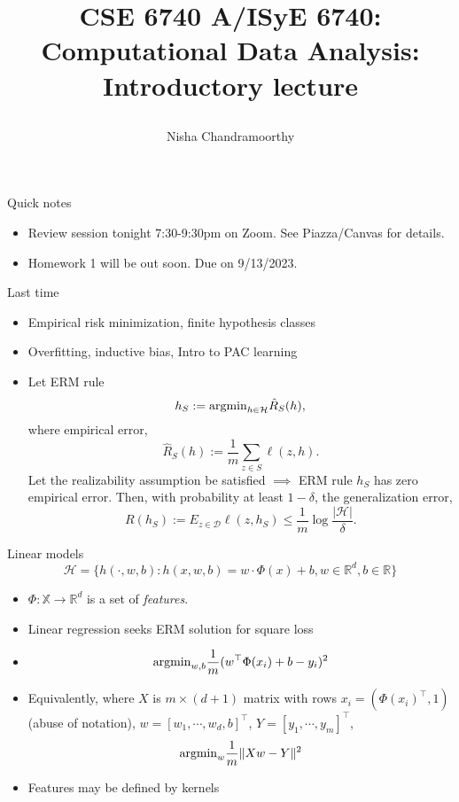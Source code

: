 \documentclass[final]{beamer}
\title{\begin{huge}{CSE 6740 A/ISyE 6740: Computational Data Analysis: Introductory lecture}\end{huge}} %
\author{Nisha Chandramoorthy} %
\begin{document}
\frame{\titlepage}

\begin{frame}{Quick notes}
\begin{itemize}
	\item Review session tonight 7:30-9:30pm on Zoom. See Piazza/Canvas for details.
	\item Homework 1 will be out soon. Due on 9/13/2023.
\end{itemize}
\end{frame}
\begin{frame}{Last time}
\begin{itemize}
	\item Empirical risk minimization, finite hypothesis classes
	\pause 
	\item Overfitting, inductive bias, Intro to PAC learning
	\pause 
\item Let ERM rule $$h_S := {\rm argmin}_{h\in \mathcal{H}} \hat{R}_S(h),$$ where empirical error, $$\hat{R}_S(h) := \dfrac{1}{m} \sum_{z \in S}\ell(z,h).$$ Let the realizability assumption be satisfied $\implies$ ERM rule $h_S$ has zero empirical error. Then, with probability at least $1-\delta$, the generalization error, 
	$$R(h_S) := E_{z\in \mathcal{D}} \ell(z, h_S) \leq \dfrac{1}{m} \log\dfrac{|\mathcal{H}|}{\delta}.$$
\end{itemize}
\end{frame}
\begin{frame}{Linear models}
	\begin{equation}
		\mathcal{H} = \{h(\cdot, w, b): h(x, w, b) = w\cdot \Phi(x) + b, w \in \mathbb{R}^d, b \in \mathbb{R} \}
	\end{equation}
\pause
\begin{itemize}
	\item $\Phi: \mathbb{X} \to \mathbb{R}^d$ is a set of \emph{features}.
	\pause
	\item Linear regression seeks ERM solution for square loss
	\pause
	\item $${\rm arg min}_{w, b} \dfrac{1}{m} (w^\top \Phi(x_i) + b - y_i)^2$$
	\pause 
\item Equivalently, where $X$ is $m\times (d+1)$ matrix with rows $x_i = (\Phi(x_i)^\top, 1)$ (abuse of notation), $w = [w_1, \cdots, w_d, b]^\top$, $Y = [y_1, \cdots, y_m]^\top$,
	\pause
	$$ {\rm arg min}_{w} \dfrac{1}{m} \|X w - Y\|^2$$
\item Features may be defined by kernels
\end{itemize}
\end{frame}
\end{document}
